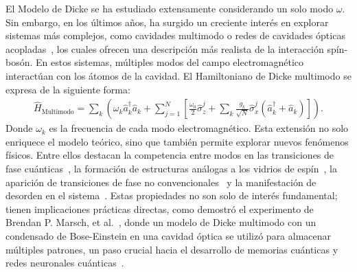 \documentclass[onecolumn,notitlepage,letterpaper,aps,pra,12pt]{article}
\numberwithin{equation}{section}
\begin{document}
El Modelo de Dicke se ha estudiado extensamente considerando un solo modo $\omega$. %
Sin embargo, en los últimos años, ha surgido un creciente interés en explorar sistemas más complejos, como cavidades multimodo o redes de cavidades ópticas acopladas~\cite{tolkunov2007,fiorelli2020,carollo2021}, los cuales ofrecen una descripción más realista de la interacción spín-bosón. En estos sistemas, múltiples modos del campo electromagnético interactúan con los átomos de la cavidad. El Hamiltoniano de Dicke multimodo se expresa de la siguiente forma:
\begin{gather}
        \hat{H}_{\text{Multimodo}} = \sum_{k}\left(\omega_{k}\hat{a}^{\dagger}_{k}\hat{a}_{k} + \sum_{j=1}^{N}\left[ \frac{\omega_{0}}{2}\hat{\sigma}_{z}^{j} + \sum_{k}\frac{g_{k}}{\sqrt{N}}\hat{\sigma}_{x}^{j}\left(\hat{a}^{\dagger}_{k} + \hat{a}_{k}\right) \right]\right).
\end{gather}
Donde $\omega_{k}$ es la frecuencia de cada modo electromagnético. Esta extensión no solo enriquece el modelo teórico, sino que también permite explorar nuevos fenómenos físicos. Entre ellos destacan la competencia entre modos en las transiciones de fase cuánticas~\cite{tolkunov2007}, la formación de estructuras análogas a los vidrios de espín~\cite{rotondo2015}, la aparición de transiciones de fase no convencionales~\cite{kipf2014} y la manifestación de desorden en el sistema~\cite{vojta2013,das2024}. Estas propiedades no son solo de interés fundamental; tienen implicaciones prácticas directas, como demostró el experimento de Brendan P. Marsch, et al.~\cite{marsch2021}, donde un modelo de Dicke multimodo con un condensado de Bose-Einstein en una cavidad óptica se utilizó para almacenar múltiples patrones, un paso crucial hacia el desarrollo de memorias cuánticas y redes neuronales cuánticas~\cite{maniscalco2006,fiorelli2020}.




\end{document}
